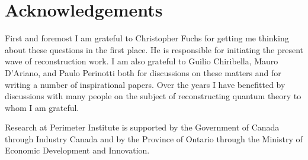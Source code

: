 \documentclass[10pt]{article}
\begin{document}
\section*{Acknowledgements}

First and foremost I am grateful to Christopher Fuchs for getting me thinking about these questions in the first place.  He is responsible for initiating the present wave of reconstruction work.  I am also grateful to Guilio Chiribella, Mauro D'Ariano, and Paulo Perinotti both for discussions on these matters and for writing a number of inspirational papers.  Over the years I have benefitted by discussions with many people on the subject of reconstructing quantum theory to whom I am grateful.

Research at Perimeter Institute is supported by the Government 
of Canada through Industry Canada and by the Province of Ontario through the Ministry
of Economic Development and Innovation.






 



































\end{document}
